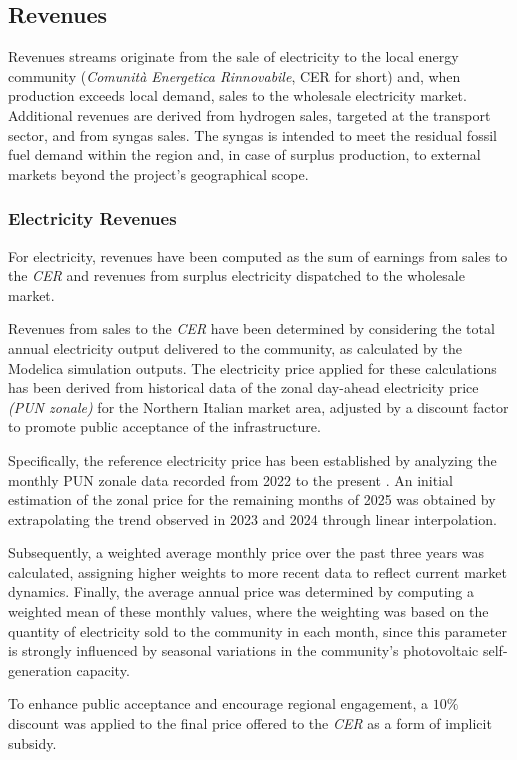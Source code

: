 \subsection{Revenues}
Revenues streams originate from the sale of electricity to the local energy community (\textit{Comunità Energetica Rinnovabile}, CER for short) and, when production exceeds local demand, sales to the wholesale electricity market. Additional revenues are derived from hydrogen sales, targeted at the transport sector, and from syngas sales. The syngas is intended to meet the residual fossil fuel demand within the region and, in case of surplus production, to external markets beyond the project’s geographical scope.

\subsubsection{Electricity Revenues}
For electricity, revenues have been computed as the sum of earnings from sales to the \textit{CER} and revenues from surplus electricity dispatched to the wholesale market. 

Revenues from sales to the \textit{CER} have been determined by considering the total annual electricity output delivered to the community, as calculated by the Modelica simulation outputs. The electricity price applied for these calculations has been derived from historical data of the zonal day-ahead electricity price \textit{(PUN zonale)} for the Northern Italian market area, adjusted by a discount factor to promote public acceptance of the infrastructure.

Specifically, the reference electricity price has been established by analyzing the monthly PUN zonale data recorded from 2022 to the present \cite{GSE2023}. An initial estimation of the zonal price for the remaining months of 2025 was obtained by extrapolating the trend observed in 2023 and 2024 through linear interpolation. 

Subsequently, a weighted average monthly price over the past three years was calculated, assigning higher weights to more recent data to reflect current market dynamics. Finally, the average annual price was determined by computing a weighted mean of these monthly values, where the weighting was based on the quantity of electricity sold to the community in each month, since this parameter is strongly influenced by seasonal variations in the community’s photovoltaic self-generation capacity. 

To enhance public acceptance and encourage regional engagement, a $10\%$ discount was applied to the final price offered to the \textit{CER} as a form of implicit subsidy.

